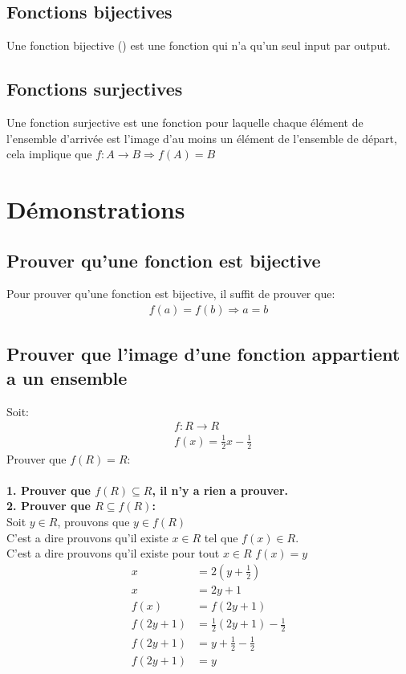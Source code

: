\documentclass{article}
\begin{document}
\subsection{Fonctions bijectives}
  
Une fonction bijective () est une fonction qui n'a qu'un seul input par output.\\

\subsection{Fonctions surjectives}
Une fonction surjective est une fonction pour laquelle chaque élément de l'ensemble d'arrivée est l'image d'au moins un élément de l'ensemble de départ, cela implique que $f: A \to B \Rightarrow f(A) = B$
 
\section{Démonstrations}
\subsection{Prouver qu'une fonction est bijective}
Pour prouver qu'une fonction est bijective, il suffit de prouver que:
\begin{align*}
  f(a) = f(b) \Rightarrow a = b
\end{align*}

\subsection{Prouver que l'image d'une fonction appartient a un ensemble}
Soit:
\begin{align*}
  &f : R \to R\\
  &f(x) = \frac{1}{2}x - \frac{1}{2}
\end{align*}
Prouver que $f(R) = R$:\\
\\
\textbf{1. Prouver que $f(R) \subseteq R$, il n'y a rien a prouver.\\}
\textbf{2. Prouver que $R \subseteq f(R)$:\\}
Soit $y \in R$, prouvons que $y \in f(R)$\\
C'est a dire prouvons qu'il existe $x \in R$ tel que $f(x) \in R$.\\
C'est a dire prouvons qu'il existe pour tout $x \in R$ $f(x) = y$
\begin{align*}
  x &= 2(y + \frac{1}{2})\\
  x &= 2y + 1\\
  f(x) &= f(2y +1)\\
  f(2y + 1) &= \frac{1}{2}(2y + 1) - \frac{1}{2}\\
  f(2y + 1) &= y+\frac{1}{2} - \frac{1}{2} \\
  f(2y + 1) &= y\\
\end{align*}
\end{document}
